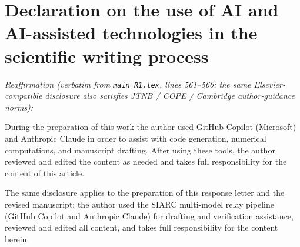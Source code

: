 \documentclass[11pt]{amsart}
\begin{document}
\section*{Declaration on the use of AI and AI-assisted technologies in the scientific writing process}

\noindent\textit{Reaffirmation (verbatim from \texttt{main\_R1.tex},
lines 561--566; the same Elsevier-compatible disclosure also satisfies
JTNB / COPE / Cambridge author-guidance norms):}

\medskip

\noindent
During the preparation of this work the author used GitHub Copilot
(Microsoft) and Anthropic Claude in order to assist with code
generation, numerical computations, and manuscript drafting.  After
using these tools, the author reviewed and edited the content as
needed and takes full responsibility for the content of this article.

\medskip

\noindent
The same disclosure applies to the preparation of this response
letter and the revised manuscript: the author used the SIARC
multi-model relay pipeline (GitHub Copilot and Anthropic Claude)
for drafting and verification assistance, reviewed and edited all
content, and takes full responsibility for the content herein.
\end{document}
